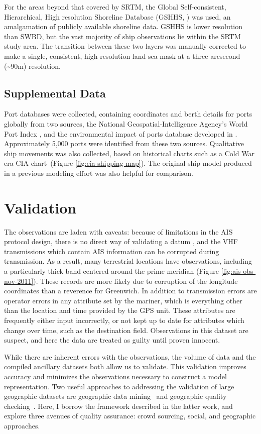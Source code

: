 For the areas beyond that covered by SRTM, the Global Self-consistent, Hierarchical, High resolution Shoreline Database (GSHHS, \citealp{wessel1996global}) was used, an amalgamation of publicly available shoreline data. GSHHS is lower resolution than SWBD, but the vast majority of ship observations lie within the SRTM study area. The transition between these two layers was manually corrected to make a single, consistent, high-resolution land-sea mask at a three arcsecond (\textasciitilde{}90m) resolution.

\subsection{Supplemental Data}
Port databases were collected, containing coordinates and berth details for ports globally from two sources, the National Geospatial-Intelligence Agency's World Port Index \citep{worldportindex}, and the environmental impact of ports database developed in \cite{Halpern2008}. Approximately 5,000 ports were identified from these two sources.  Qualitative ship movements was also collected, based on historical charts such as a Cold War era CIA chart~(Figure \ref{fig:cia-shipping-map}). The original ship model produced in a previous modeling effort \citep{Halpern2008} was also helpful for comparison.

\section{Validation}
The observations are laden with caveats: because of limitations in the AIS protocol design, there is no direct way of validating a datum \citep{RaymondInPress}, and the VHF transmissions which contain AIS information can be corrupted during transmission. As a result, many terrestrial locations have observations, including a particularly thick band centered around the prime meridian (Figure \ref{fig:ais-obs-nov-2011}). These records are more likely due to corruption of the longitude coordinates than a reverence for Greenwich. In addition to transmission errors are operator errors in any attribute set by the mariner, which is everything other than the location and time provided by the GPS unit. These attributes are frequently either input incorrectly, or not kept up to date for attributes which change over time, such as the destination field. Observations in this dataset are suspect, and here the data are treated as guilty until proven innocent.

While there are inherent errors with the observations, the volume of data and the compiled ancillary datasets both allow us to validate. This validation improves accuracy and minimizes the observations necessary to construct a model representation. Two useful approaches to addressing the validation of large geographic datasets are geographic data mining~\citep{miller2009geographic} and geographic quality checking~\cite{goodchildli2012}. Here, I borrow the framework described in the latter work, and explore three avenues of quality assurance: crowd sourcing, social, and geographic approaches.

